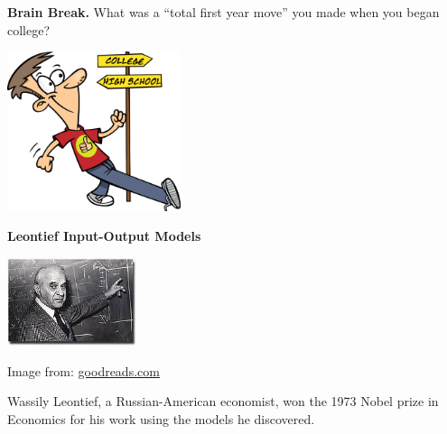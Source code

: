 \documentclass[handout]{beamer}
\newcommand{\fn}{\insertframenumber}
\theoremstyle{definition}
\begin{document}

\begin{frame}{\fn}
	\begin{block}{\textbf{Brain Break.}}
		What was a “total first year move” you made when you began college?
		\begin{center}
			\includegraphics[width=2in]{images/first_year}
		\end{center}
	\end{block}
\end{frame}


\begin{frame}{\fn}
	\begin{center}
		{\large{}\textbf{Leontief Input-Output Models}}
		
		\includegraphics[width=1.5in]{images/leontief}
		
		{\footnotesize Image from: \href{https://www.goodreads.com/author/show/181430.Wassily_Leontief}{goodreads.com}}
	\end{center}
	Wassily Leontief, a Russian-American economist, won the 1973 Nobel prize in Economics for his work using the models he discovered.
\end{frame}
\end{document}
